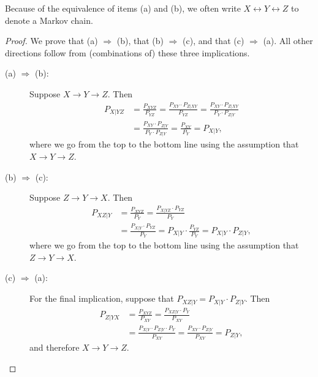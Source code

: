 Because of the equivalence of items (a) and (b), we often write $X \leftrightarrow Y \leftrightarrow Z$ to denote a Markov chain.

\begin{proof}
We prove that (a) $\Rightarrow$ (b), that (b) $\Rightarrow$ (c), and that (c) $\Rightarrow$ (a). All other directions follow from (combinations of) these three implications.
\begin{description}
\item[(a) $\Rightarrow$ (b):] Suppose $X \to Y \to Z$. Then
\begin{align}
P_{X|YZ} &= \frac{P_{XYZ}}{P_{YZ}} = \frac{P_{XY} \cdot P_{Z|XY}}{P_{YZ}} = \frac{P_{XY} \cdot P_{Z|XY}}{P_Y \cdot P_{Z|Y}}\nonumber\\
&= \frac{P_{XY} \cdot P_{Z|Y}}{P_Y \cdot P_{Z|Y}} = \frac{P_{XY}}{P_Y} = P_{X|Y},
\end{align}
where we go from the top to the bottom line using the assumption that $X \to Y \to Z$.
\item[(b) $\Rightarrow$ (c):] Suppose $Z \to Y \to X$. Then
\begin{align}
P_{XZ|Y} &= \frac{P_{XYZ}}{P_Y} = \frac{P_{X|YZ} \cdot P_{YZ}}{P_Y}\nonumber\\
&= \frac{P_{X|Y} \cdot P_{YZ}}{P_Y} = P_{X|Y} \cdot \frac{P_{YZ}}{P_Y} = P_{X|Y} \cdot P_{Z|Y},
\end{align}
where we go from the top to the bottom line using the assumption that $Z \to Y \to X$.
\item[(c) $\Rightarrow$ (a):] For the final implication, suppose that $P_{XZ|Y} = P_{X|Y} \cdot P_{Z|Y}$. Then
\begin{align}
P_{Z|YX} &= \frac{P_{XYZ}}{P_{XY}} = \frac{P_{XZ|Y} \cdot P_Y}{P_{XY}}\nonumber\\
&= \frac{P_{X|Y} \cdot P_{Z|Y} \cdot P_Y}{P_{XY}} = \frac{P_{XY} \cdot P_{Z|Y}}{P_{XY}} = P_{Z|Y},
\end{align}
and therefore $X \to Y \to Z$.
\end{description}
\end{proof}

